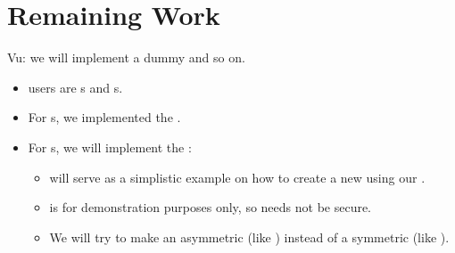 \section{Remaining Work}


Vu: we will implement a dummy \cs{} and so on.

\begin{itemize}
\item \cry{} users are \eu s and \cg s.
\item For \eu s, we implemented the \rsa{} \cs.
\item For \cg s, we will implement the \dummy{} \cs:
  \begin{itemize}
  \item \dummy{} will serve as a simplistic example
    on how to create a new \cs{} using our \cry{} \cf.
  \item \dummy{} is for demonstration purposes only,
    so \dummy{} needs not be secure.
  \item We will try to make \dummy{} an asymmetric \cs{}
    (like \rsa) instead of a symmetric \cs{} (like \aes).
  \end{itemize}
\end{itemize}
